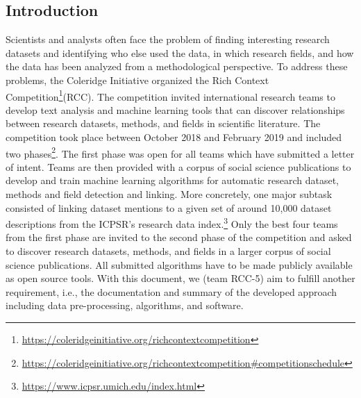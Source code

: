 \subsection {Introduction}
Scientists and analysts often face the problem of finding interesting research datasets and identifying who else used the data, in which research fields, and how the data has been analyzed from a methodological perspective.
To address these problems, the Coleridge Initiative organized the Rich Context Competition\footnote{\url{https://coleridgeinitiative.org/richcontextcompetition}}(RCC).
The competition invited international research teams to develop text analysis and machine learning tools that can discover relationships between research datasets, methods, and fields in scientific literature.
The competition took place between October 2018 and February 2019 and included two phases\footnote{\url{https://coleridgeinitiative.org/richcontextcompetition\#competitionschedule}}. The first phase was open for all teams which have submitted a letter of intent.
Teams are then provided with a corpus of social science publications to develop and train machine learning algorithms for automatic research dataset, methods and field detection and linking. 
More concretely, one major subtask consisted of linking dataset mentions to a given set of around 10,000 dataset descriptions from the ICPSR’s research data index.\footnote{\url{https://www.icpsr.umich.edu/index.html}}
Only the best four teams from the first phase are invited to the second phase of the competition and asked to discover research datasets, methods, and fields in a larger corpus of social science publications. All submitted algorithms have to be made publicly available as open source tools. With this document, we (team RCC-5) aim to fulfill another requirement, i.e., the documentation and summary of the developed approach including data pre-processing, algorithms, and software. 


